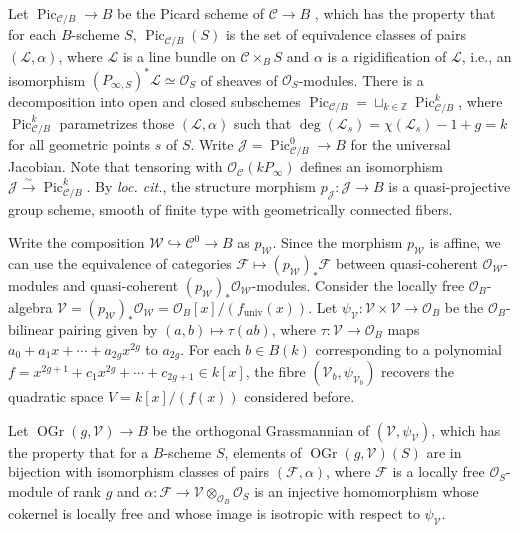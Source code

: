 \documentclass{article} %
\numberwithin{equation}{section}
\DeclareMathOperator{\Pic}{Pic}
\newcommand{\sh}[1]{\mathscr{#1}}
\renewcommand{\O}{\mathcal{O}}
\newcommand{\Z}{\mathbb{Z}}
\DeclareMathOperator{\OGr}{OGr}
\begin{document}
Let $\Pic_{\mathcal{C}/B}\rightarrow B$ be the Picard scheme of $\mathcal{C}\rightarrow B$ \cite[Section 9.3, Theorem 1]{BLR-neronmodels}, which has the property that for each $B$-scheme $S$, $\Pic_{\mathcal{C}/B}(S)$ is the set of equivalence classes of pairs $(\sh{L}, \alpha)$, where $\sh{L}$ is a line bundle on $\mathcal{C}\times_B S$ and $\alpha$ is a rigidification of $\sh{L}$, i.e., an isomorphism $(P_{\infty,S})^*\sh{L}\simeq \O_S$ of sheaves of $\O_S$-modules.
There is a decomposition into open and closed subschemes $\Pic_{\mathcal{C}/B} = \sqcup_{k\in \Z} \Pic_{\mathcal{C}/B}^k$, where $\Pic_{\mathcal{C}/B}^k$ parametrizes those $(\sh{L}, \alpha)$ such that $\deg(\sh{L}_s) = \chi(\sh{L}_s) - 1+ g=k$ for all geometric points $s$ of $S$.
Write $\mathcal{J} = \Pic^0_{\mathcal{C}/B}\rightarrow B$ for the universal Jacobian.
Note that tensoring with $\O_{\mathcal{C}}(k P_{\infty})$ defines an isomorphism $\mathcal{J}\xrightarrow{\sim} \Pic^k_{\mathcal{C}/B}$.
By \emph{loc. cit.}, the structure morphism $p_{\mathcal{J}} \colon \mathcal{J}\rightarrow B$ is a quasi-projective group scheme, smooth of finite type with geometrically connected fibers.

Write the composition $\mathcal{W}\hookrightarrow \mathcal{C}^{0}\rightarrow B$ as $p_{\mathcal{W}}$.
Since the morphism $p_{\mathcal{W}}$ is affine, we can use the equivalence of categories $\sh{F}\mapsto (p_{\mathcal{W}})_*\sh{F}$ between quasi-coherent $\O_{\mathcal{W}}$-modules and quasi-coherent $(p_{\mathcal{W}})_* \O_{\mathcal{W}}$-modules.
Consider the locally free $\O_B$-algebra $\sh{V}= (p_{\mathcal{W}})_* \O_{\mathcal{W}}= \O_B[x]/(f_{\mathrm{univ}}(x))$.
Let $\psi_{\sh{V}} \colon \sh{V} \times \sh{V}\rightarrow \O_B$ be the $\O_B$-bilinear pairing given by $(a,b)\mapsto \tau(ab)$, where $\tau\colon \sh{V}\rightarrow \O_B$ maps $a_0 + a_1x  +\cdots + a_{2g}x^{2g}$ to $a_{2g}$.
For each $b\in B(k)$ corresponding to a polynomial $f = x^{2g+1} + c_1x^{2g} +\cdots + c_{2g+1} \in k[x]$, the fibre $(\sh{V}_b,\psi_{\sh{V}_b})$ recovers the quadratic space $V = k[x]/(f(x))$ considered before.

Let $\OGr(g, \sh{V})\rightarrow B$ be the orthogonal Grassmannian of $(\sh{V}, \psi_{\sh{V}})$, which has the property that for a $B$-scheme $S$, elements of $\OGr(g, \sh{V})(S)$ are in bijection with isomorphism classes of pairs $(\sh{F}, \alpha)$, where $\sh{F}$ is a locally free $\O_S$-module of rank $g$ and $\alpha\colon \sh{F}\rightarrow \sh{V}\otimes_{\O_B}\O_S$ is an injective homomorphism whose cokernel is locally free and whose image is isotropic with respect to $\psi_{\sh{V}}$.
\end{document}
